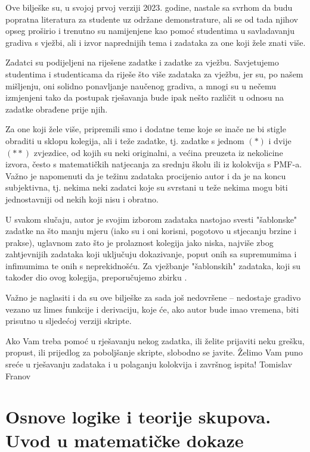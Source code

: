 \documentclass{book}
\begin{document}
Ove bilješke su, u svojoj prvoj verziji 2023. godine, nastale sa svrhom da budu popratna literatura za studente uz održane demonstrature, ali se od tada njihov opseg proširio i trenutno su namijenjene kao pomoć studentima u savladavanju gradiva s vježbi, ali i izvor naprednijih tema i zadataka za one koji žele znati više. 

Zadatci su podijeljeni na riješene zadatke i zadatke za vježbu. Savjetujemo studentima i studenticama da riješe što više zadataka za vježbu, jer su, po našem mišljenju, oni solidno ponavljanje naučenog gradiva, a mnogi su u nečemu izmjenjeni tako da postupak rješavanja bude ipak nešto različit u odnosu na zadatke obrađene prije njih.

Za one koji žele više, pripremili smo i dodatne teme koje se inače ne bi stigle obraditi u sklopu kolegija, ali i teže zadatke, tj. zadatke s jednom $(*)$ i dvije $(**)$ zvjezdice, od kojih su neki originalni, a većina preuzeta iz nekolicine izvora, često s matematičkih natjecanja za srednju školu ili iz kolokvija s PMF-a. Važno je napomenuti da je težinu zadataka procijenio autor i da je na koncu subjektivna, tj. nekima neki zadatci koje su svrstani u teže nekima mogu biti jednostavniji od nekih koji nisu i obratno.

U svakom slučaju, autor je svojim izborom zadataka nastojao svesti "šablonske" zadatke na što manju mjeru (iako su i oni korisni, pogotovo u stjecanju brzine i prakse), uglavnom zato što je prolaznost kolegija jako niska, najviše zbog zahtjevnijih zadataka koji uključuju dokazivanje, poput onih sa supremumima i infimumima te onih s neprekidnošću. Za vježbanje "šablonskih" zadataka, koji su također dio ovog kolegija, preporučujemo zbirku \cite{8}.

Važno je naglasiti i da su ove bilješke za sada još nedovršene -- nedostaje gradivo vezano uz limes funkcije i derivaciju, koje će, ako autor bude imao vremena, biti prisutno u sljedećoj verziji skripte.

Ako Vam treba pomoć u rješavanju nekog zadatka, ili želite prijaviti neku grešku, propust, ili prijedlog za poboljšanje skripte, slobodno se javite. Želimo Vam puno sreće u rješavanju zadataka i u polaganju kolokvija i završnog ispita!
\flushright
\flushleft
\justifying
\noindent Tomislav Franov
\thispagestyle{empty}
\large
\pagestyle{fancy}
\fancyhead[RO, RE]{}
\chapter{Osnove logike i teorije skupova. Uvod u matematičke dokaze}
\end{document}
